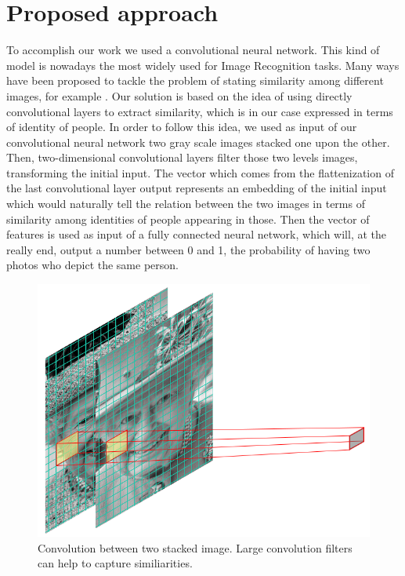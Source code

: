 \section{Proposed approach}
To accomplish our work we used a convolutional neural network. This kind of model is nowadays the most widely used for Image Recognition tasks. Many ways have been proposed to tackle the problem of stating similarity among different images, for example . Our solution is based on the idea of using directly convolutional layers to extract similarity, which is in our case expressed in terms of identity of people. In order to follow this idea, we used as input of our convolutional neural network two gray scale images stacked one upon the other. Then, two-dimensional convolutional layers filter those two levels images, transforming the initial input. The vector which comes from the flattenization of the last convolutional layer output represents an embedding of the initial input which would naturally tell the relation between the two images in terms of similarity among identities of people appearing in those. Then the vector of features is used as input of a fully connected neural network, which will, at the really end, output a number between 0 and 1, \ie the probability of having two photos who depict the same person.

\begin{figure}[t]
\includegraphics[width=0.8\linewidth]{images/stackedconvolution.png}
   \caption{Convolution between two stacked image. Large convolution filters can help to capture similiarities.}
\label{fig:long}
\label{fig:onecol}
\end{figure}

